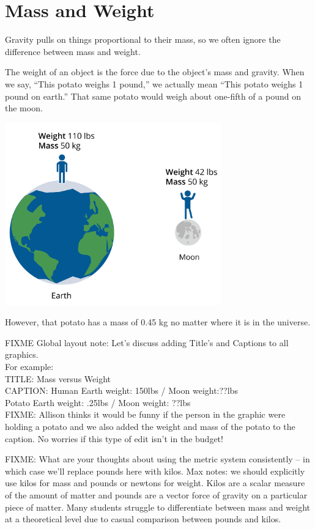 \section{Mass and Weight}

Gravity pulls on things proportional to their mass, so we often
ignore the difference between mass and weight.

The weight of an object is the force due to the object's mass and
gravity. When we say, ``This potato weighs 1 pound,'' we actually mean
``This potato weighs 1 pound on earth.'' That same potato would weigh
about one-fifth of a pound on the moon.

\includegraphics[width=0.7\textwidth]{massvweight.png}

However, that potato has a mass of 0.45 kg no matter where it is in the universe.

FIXME Global layout note: Let's discuss adding Title's and Captions to all graphics.\\

For example:\\
TITLE: Mass versus Weight\\
CAPTION: Human Earth weight: 150lbs / Moon weight:??lbs\\
Potato Earth weight: .25lbs / Moon weight: ??lbs \\

FIXME:
Allison thinks it would be funny if the person in the graphic were holding a potato and we also added the weight and mass of the potato to the caption. No worries if this type of edit isn't in the budget!

FIXME: What are your thoughts about using the metric system consistently -- in which case we'll replace pounds here with kilos. Max notes: we should explicitly use kilos for mass and pounds or newtons for weight. Kilos are a scalar measure of the amount of matter and pounds are a vector force of gravity on a particular piece of matter. Many students struggle to differentiate between mass and weight at a theoretical level due to casual comparison between pounds and kilos.
